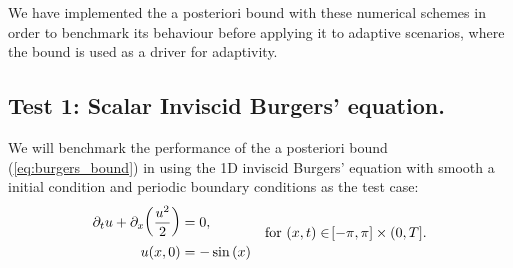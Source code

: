 \documentclass[final]{amsart}
\numberwithin{equation}{section}
\begin{document}
We have implemented the a posteriori bound with these numerical
schemes in order to benchmark its behaviour before applying it to
adaptive scenarios, where the bound is used as a driver for
adaptivity.

\subsection{Test 1: Scalar Inviscid Burgers' equation. }
We will benchmark the performance of the a posteriori bound
(\ref{eq:burgers_bound}) in using the 1D inviscid Burgers' equation
with smooth a initial condition and periodic boundary conditions as
the test case:
\begin{equation}\label{eq_burgers}
\begin{aligned}
\partial_t u +\partial_x\!\left({\frac{u^2}{2}}\right)&=0,\\
u\!\left({x,0}\right)&=-\operatorname{sin}\left(x\right)
\end{aligned}\quad \text{for }\!\left({x,t}\right) \in \!\left[{-\pi,\pi}\right]\times(0,T].
\end{equation}
\end{document}
